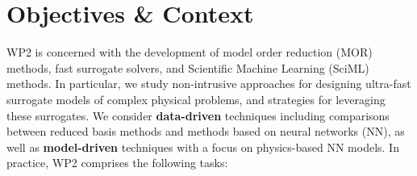 
\section{Objectives \& Context}

WP2 is concerned  with the development of model  order reduction (MOR)
methods,  fast  surrogate  solvers, and  Scientific  Machine  Learning
(SciML) methods.  In particular, we study non-intrusive approaches for
designing ultra-fast  surrogate models  of complex  physical problems,
and  strategies for  leveraging  these surrogates.   We consider  {\bf
  data-driven} techniques including  comparisons between reduced basis
methods and  methods based on  neural networks  (NN), as well  as {\bf
  model-driven} techniques  with a  focus on physics-based  NN models.
In practice, WP2 comprises the following tasks:
